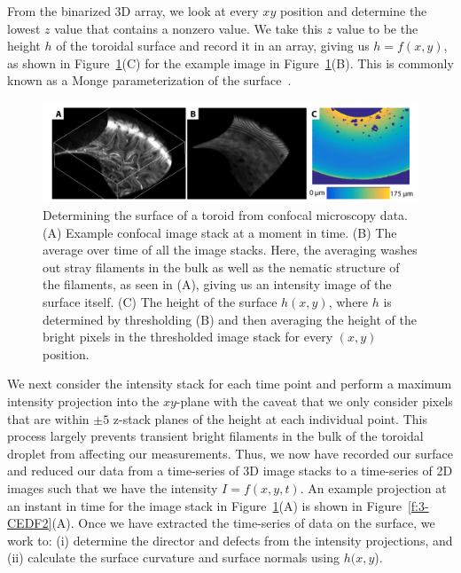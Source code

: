 From the binarized 3D array, we look at every $xy$ position and determine the lowest $z$ value that contains a nonzero value.
We take this $z$ value to be the height $h$ of the toroidal surface and record it in an array, giving us $h = f(x,y)$, as shown in Figure~\ref{f:3-SurfaceHeight}(C) for the example image in Figure~\ref{f:3-SurfaceHeight}(B).
This is commonly known as a Monge parameterization of the surface~\cite{RN23}.
\begin{figure}
  \centering
  \includegraphics{figures/C3/Ch3-Figs_SurfaceHeight.png}
  \caption{Determining the surface of a toroid from confocal microscopy data.
  (A) Example confocal image stack at a moment in time.
  (B) The average over time of all the image stacks.
  Here, the averaging washes out stray filaments in the bulk as well as the nematic structure of the filaments, as seen in (A), giving us an intensity image of the surface itself.
  (C) The height of the surface $h(x,y)$, where $h$ is determined by thresholding (B) and then averaging the height of the bright pixels in the thresholded image stack for every $(x,y)$ position.}\label{f:3-SurfaceHeight}
\end{figure}

We next consider the intensity stack for each time point and perform a maximum intensity projection into the $xy$-plane with the caveat that we only consider pixels that are within $\pm 5$ z-stack planes of the height at each individual point.
This process largely prevents transient bright filaments in the bulk of the toroidal droplet from affecting our measurements.
Thus, we now have recorded our surface and reduced our data from a time-series of 3D image stacks to a time-series of 2D images such that we have the intensity $I = f(x,y,t)$.
An example projection at an instant in time for the image stack in Figure~\ref{f:3-SurfaceHeight}(A) is shown in Figure~\ref{f:3-CEDF2}(A).
Once we have extracted the time-series of data on the surface, we work to: (i) determine the director and defects from the intensity projections, and (ii) calculate the surface curvature and surface normals using $h(x,y$).




